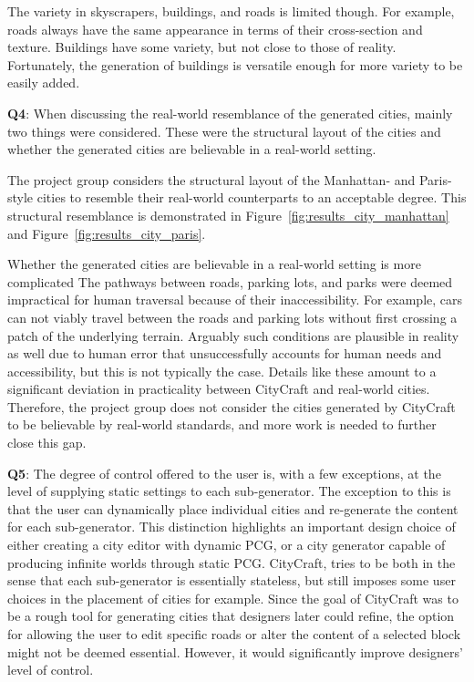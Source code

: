 The variety in skyscrapers, buildings, and roads is limited though.
For example, roads always have the same appearance in terms of their cross-section and texture.
Buildings have some variety, but not close to those of reality.
Fortunately, the generation of buildings is versatile enough for more variety to be easily added.

\textbf{Q4}:
When discussing the real-world resemblance of the generated cities, mainly two things were considered.
These were the structural layout of the cities and whether the generated cities are believable in a real-world setting. 

The project group considers the structural layout of the Manhattan- and Paris-style cities to resemble their real-world counterparts to an acceptable degree.
This structural resemblance is demonstrated in Figure~\ref{fig:results_city_manhattan} and Figure~\ref{fig:results_city_paris}.

Whether the generated cities are believable in a real-world setting is more complicated 
The pathways between roads, parking lots, and parks were deemed impractical for human traversal because of their inaccessibility.
For example, cars can not viably travel between the roads and parking lots without first crossing a patch of the underlying terrain.
Arguably such conditions are plausible in reality as well due to human error that unsuccessfully accounts for human needs and accessibility, but this is not typically the case.
Details like these amount to a significant deviation in practicality between CityCraft and real-world cities.
Therefore, the project group does not consider the cities generated by CityCraft to be believable by real-world standards, and more work is needed to further close this gap.

\textbf{Q5}:
The degree of control offered to the user is, with a few exceptions, at the level of supplying static settings to each sub-generator.
The exception to this is that the user can dynamically place individual cities and re-generate the content for each sub-generator.
This distinction highlights an important design choice of either creating a city editor with dynamic PCG, or a city generator capable of producing infinite worlds through static PCG.
CityCraft, tries to be both in the sense that each sub-generator is essentially stateless, but still imposes some user choices in the placement of cities for example.
Since the goal of CityCraft was to be a rough tool for generating cities that designers later could refine, the option for allowing the user to edit specific roads or alter the content of a selected block might not be deemed essential.
However, it would significantly improve designers' level of control.

